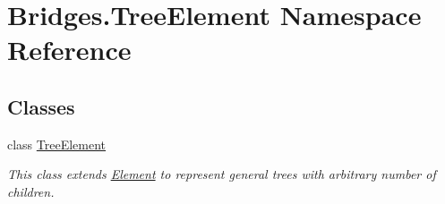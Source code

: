 \hypertarget{namespace_bridges_1_1_tree_element}{}\section{Bridges.\+Tree\+Element Namespace Reference}
\label{namespace_bridges_1_1_tree_element}
\subsection*{Classes}
\begin{DoxyCompactItemize}
\item 
class \hyperlink{class_bridges_1_1_tree_element_1_1_tree_element}{Tree\+Element}
\begin{DoxyCompactList}\small\item\em This class extends \hyperlink{namespace_bridges_1_1_element}{Element} to represent general trees with arbitrary number of children. \end{DoxyCompactList}\end{DoxyCompactItemize}

